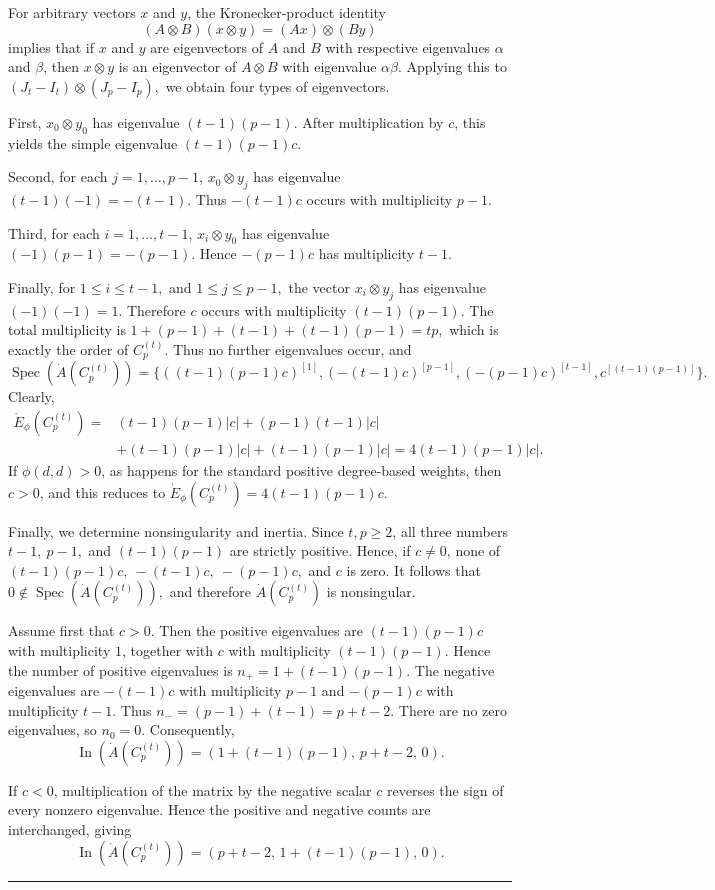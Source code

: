 \documentclass[12pt,twoside]{article}
\renewenvironment{proof}{{\noindent\bfseries Proof.}}{\qed}
\newcommand{\spec}{\operatorname{Spec}}
\def\qed{\nolinebreak\hfill\rule{.2cm}{.2cm}\par\addvspace{.5cm}}
\begin{document}
\begin{proof}
	For arbitrary vectors $x$ and $y$, the Kronecker-product identity
	$$
	(A\otimes B)(x\otimes y)
	=
	(Ax)\otimes(By)
	$$
	implies that if $x$ and $y$ are eigenvectors of $A$ and $B$ with respective eigenvalues $\alpha$ and $\beta$, then $x\otimes y$ is an eigenvector of $A\otimes B$ with eigenvalue $\alpha\beta$. Applying this to
	$
	(J_t-I_t)\otimes(J_p-I_p),
	$
	we obtain four types of eigenvectors.
	
	First,
	$
	x_0\otimes y_0
	$
	has eigenvalue
	$
	(t-1)(p-1).
	$
	After multiplication by $c$, this yields the simple eigenvalue
	$
	(t-1)(p-1)c.
	$
	
	Second, for each $j=1,\ldots,p-1$,
	$
	x_0\otimes y_j
	$
	has eigenvalue
	$
	(t-1)(-1)=-(t-1).
	$
	Thus
	$
	-(t-1)c
	$
	occurs with multiplicity $p-1$.
	
	Third, for each $i=1,\ldots,t-1$,
	$
	x_i\otimes y_0
	$
	has eigenvalue
	$
	(-1)(p-1)=-(p-1).
	$
	Hence
	$
	-(p-1)c
	$
	has multiplicity $t-1$.
	
	Finally, for
	$
	1\leq i\leq t-1,
	$ and $
	1\leq j\leq p-1,
	$
	the vector
	$
	x_i\otimes y_j
	$
	has eigenvalue
	$
	(-1)(-1)=1.
	$
	Therefore
	$
	c
	$
	occurs with multiplicity
	$
	(t-1)(p-1).
	$	
	The total multiplicity is
	$
	1+(p-1)+(t-1)+(t-1)(p-1) =tp,
	$
	which is exactly the order of $C_p^{(t)}$. Thus no further eigenvalues occur, and
	$$
	\spec(\dot A(C_p^{(t)}))
	=
	\Big\{
	((t-1)(p-1)c)^{[1]},
	(-(t-1)c)^{[p-1]},
	(-(p-1)c)^{[t-1]},
	c^{[(t-1)(p-1)]}
	\Big\}.
	$$
	Clearly, 
	$$
	\begin{aligned}
		\dot E_\phi(C_p^{(t)})
		={}&
		(t-1)(p-1)|c|
		+
		(p-1)(t-1)|c|\\
		&+
		(t-1)(p-1)|c|
		+
		(t-1)(p-1)|c|=4(t-1)(p-1)|c|.
	\end{aligned}
	$$ 
	If $\phi(d,d)>0$, as happens for the standard positive degree-based weights, then $c>0$, and this reduces to
	$
	\dot E_\phi(C_p^{(t)})
	=
	4(t-1)(p-1)c.
	$
	
	Finally, we determine nonsingularity and inertia. Since $t,p\geq2$, all three numbers
	$
	t-1,~ p-1,$ and $ (t-1)(p-1)
	$
	are strictly positive. Hence, if $c\neq0$, none of
	$
	(t-1)(p-1)c,~
	-(t-1)c,~
	-(p-1)c,$ and $	c$
	is zero. It follows that
	$
	0\notin\spec(\dot A(C_p^{(t)})),
	$
	and therefore $\dot A(C_p^{(t)})$ is nonsingular.
	
	Assume first that $c>0$. Then the positive eigenvalues are
	$
	(t-1)(p-1)c
	$
	with multiplicity $1$, together with
	$
	c
	$
	with multiplicity $(t-1)(p-1)$. Hence the number of positive eigenvalues is
	$
	n_+
	=
	1+(t-1)(p-1).
	$
	The negative eigenvalues are
	$
	-(t-1)c
	$
	with multiplicity $p-1$ and
	$
	-(p-1)c
	$
	with multiplicity $t-1$. Thus
	$
	n_-
	=
	(p-1)+(t-1)
	=
	p+t-2.
	$
	There are no zero eigenvalues, so
	$
	n_0=0.
	$
	Consequently,
	$$
	\operatorname{In}(\dot A(C_p^{(t)}))
	=
	\left(
	1+(t-1)(p-1),\,
	p+t-2,\,
	0
	\right).
	$$
	
	If $c<0$, multiplication of the matrix by the negative scalar $c$ reverses the sign of every nonzero eigenvalue. Hence the positive and negative counts are interchanged, giving
	$$
	\operatorname{In}(\dot A(C_p^{(t)}))
	=
	\left(
	p+t-2,\,
	1+(t-1)(p-1),\,
	0
	\right).
	$$ 
\end{proof}
\end{document}
